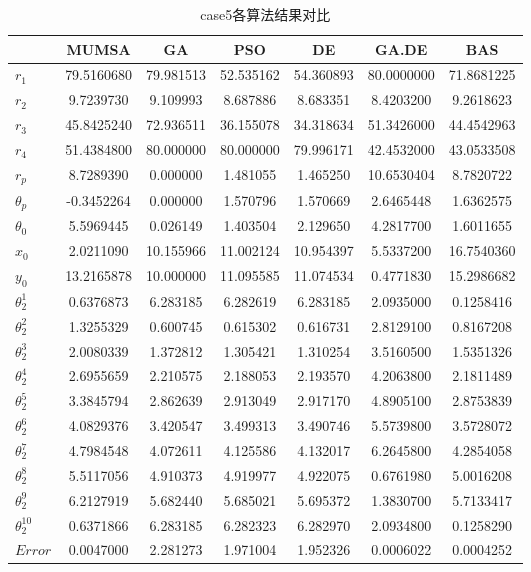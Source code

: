 \documentclass[]{ctexbook}
\begin{document}
\begin{table}[t]

\caption{\label{tab:case5table}case5各算法结果对比}
\centering
\begin{tabular}{lcccccc}
\toprule
  & MUMSA & GA & PSO & DE & GA.DE & BAS\\
\midrule
$r_1$ & 79.5160680 & 79.981513 & 52.535162 & 54.360893 & 80.0000000 & 71.8681225\\
$r_2$ & 9.7239730 & 9.109993 & 8.687886 & 8.683351 & 8.4203200 & 9.2618623\\
$r_3$ & 45.8425240 & 72.936511 & 36.155078 & 34.318634 & 51.3426000 & 44.4542963\\
$r_4$ & 51.4384800 & 80.000000 & 80.000000 & 79.996171 & 42.4532000 & 43.0533508\\
$r_p$ & 8.7289390 & 0.000000 & 1.481055 & 1.465250 & 10.6530404 & 8.7820722\\
\addlinespace
$\theta_p$ & -0.3452264 & 0.000000 & 1.570796 & 1.570669 & 2.6465448 & 1.6362575\\
$\theta_0$ & 5.5969445 & 0.026149 & 1.403504 & 2.129650 & 4.2817700 & 1.6011655\\
$x_0$ & 2.0211090 & 10.155966 & 11.002124 & 10.954397 & 5.5337200 & 16.7540360\\
$y_0$ & 13.2165878 & 10.000000 & 11.095585 & 11.074534 & 0.4771830 & 15.2986682\\
$\theta_2^1$ & 0.6376873 & 6.283185 & 6.282619 & 6.283185 & 2.0935000 & 0.1258416\\
\addlinespace
$\theta_2^2$ & 1.3255329 & 0.600745 & 0.615302 & 0.616731 & 2.8129100 & 0.8167208\\
$\theta_2^3$ & 2.0080339 & 1.372812 & 1.305421 & 1.310254 & 3.5160500 & 1.5351326\\
$\theta_2^4$ & 2.6955659 & 2.210575 & 2.188053 & 2.193570 & 4.2063800 & 2.1811489\\
$\theta_2^5$ & 3.3845794 & 2.862639 & 2.913049 & 2.917170 & 4.8905100 & 2.8753839\\
$\theta_2^6$ & 4.0829376 & 3.420547 & 3.499313 & 3.490746 & 5.5739800 & 3.5728072\\
\addlinespace
$\theta_2^7$ & 4.7984548 & 4.072611 & 4.125586 & 4.132017 & 6.2645800 & 4.2854058\\
$\theta_2^8$ & 5.5117056 & 4.910373 & 4.919977 & 4.922075 & 0.6761980 & 5.0016208\\
$\theta_2^9$ & 6.2127919 & 5.682440 & 5.685021 & 5.695372 & 1.3830700 & 5.7133417\\
$\theta_2^{10}$ & 0.6371866 & 6.283185 & 6.282323 & 6.282970 & 2.0934800 & 0.1258290\\
$Error$ & 0.0047000 & 2.281273 & 1.971004 & 1.952326 & 0.0006022 & 0.0004252\\
\bottomrule
\end{tabular}
\end{table}
\end{document}
